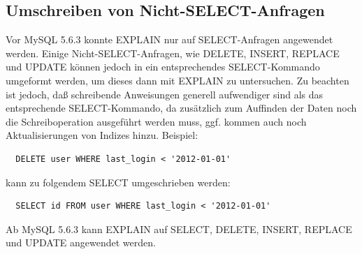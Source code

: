 \subsection{Umschreiben von Nicht-SELECT-Anfragen}
Vor MySQL 5.6.3 konnte EXPLAIN nur auf SELECT-Anfragen angewendet werden. \cite{refman1}
Einige Nicht-SELECT-Anfragen, wie DELETE, INSERT, REPLACE und UPDATE können jedoch in ein entsprechendes SELECT-Kommando umgeformt werden, um dieses dann mit EXPLAIN zu untersuchen. Zu beachten ist jedoch, daß schreibende Anweisungen generell aufwendiger sind als das entsprechende SELECT-Kommando, da zusätzlich zum Auffinden der Daten noch die Schreiboperation ausgeführt werden muss, ggf. kommen auch noch Aktualisierungen von Indizes hinzu.
Beispiel:
\begin{lstlisting}
  DELETE user WHERE last_login < '2012-01-01'
\end{lstlisting}
kann zu folgendem SELECT umgeschrieben werden:
\begin{lstlisting}
  SELECT id FROM user WHERE last_login < '2012-01-01'
\end{lstlisting}
Ab MySQL 5.6.3 kann EXPLAIN auf SELECT, DELETE, INSERT, REPLACE und UPDATE angewendet werden.\cite{refman1}

